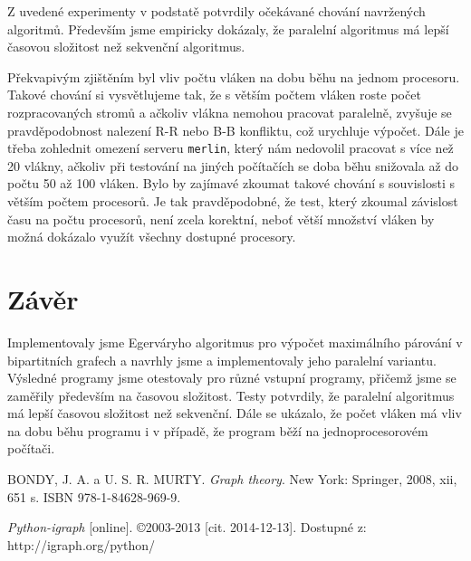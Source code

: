 \documentclass[a4paper, 11pt, titlepage, final]{article}[3. prosinec 2011]
\begin{document}
Z uvedené experimenty v podstatě potvrdily očekávané chování navržených algoritmů. Především jsme empiricky dokázaly, že paralelní algoritmus má lepší časovou složitost než sekvenční algoritmus. 

Překvapivým zjištěním byl vliv počtu vláken na dobu běhu na jednom procesoru. Takové chování si vysvětlujeme tak, že s větším počtem vláken roste počet rozpracovaných stromů a ačkoliv vlákna nemohou pracovat paralelně, zvyšuje se pravděpodobnost nalezení R-R nebo B-B konfliktu, což urychluje výpočet. Dále je třeba zohlednit omezení serveru \texttt{merlin}, který nám nedovolil pracovat s více než 20 vlákny, ačkoliv při testování na jiných počítačích se doba běhu snižovala až do počtu 50 až 100 vláken. Bylo by zajímavé zkoumat takové chování s souvislosti s větším počtem procesorů. Je tak pravděpodobné, že test, který zkoumal závislost času na počtu procesorů, není zcela korektní, neboť větší množství vláken by možná dokázalo využít všechny dostupné procesory.







\section{Závěr}

Implementovaly jsme Egerváryho algoritmus pro výpočet maximálního párování v bipartitních grafech a navrhly jsme a implementovaly jeho paralelní variantu. Výsledné programy jsme otestovaly pro různé vstupní programy, přičemž jsme se zaměřily především na časovou složitost. Testy potvrdily, že paralelní algoritmus má lepší časovou složitost než sekvenční. Dále se ukázalo, že počet vláken má vliv na dobu běhu programu i v případě, že program běží na jednoprocesorovém počítači.

\begin{thebibliography}{1}
  
   BONDY, J. A. a U. S. R. MURTY. \emph{Graph theory}. New York: Springer, 2008, xii, 651 s. ISBN 978-1-84628-969-9. 
  
   \emph{Python-igraph} [online]. \copyright 2003-2013 [cit. 2014-12-13]. Dostupné z: http://igraph.org/python/ 

\end{thebibliography}


\end{document}
